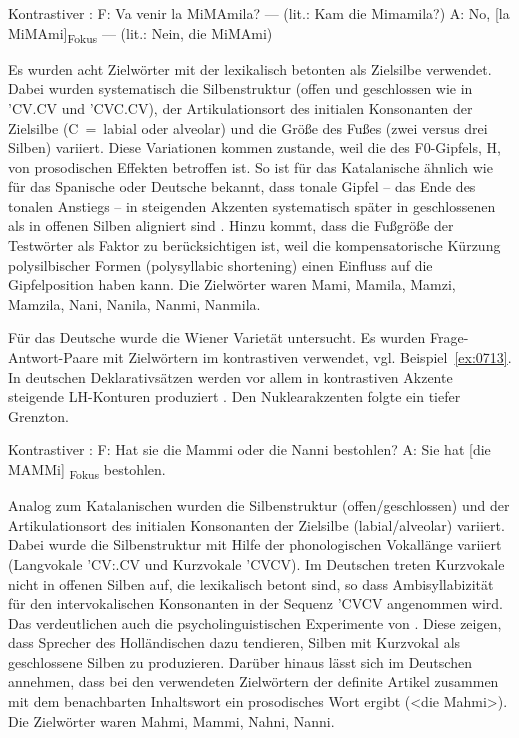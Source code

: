 \begin{exe}
	\ex Kontrastiver :\label{ex:0712}
	\sn F: Va venir la MiMAmila? --- (lit.: Kam die Mimamila?)
	\sn A: No, [la MiMAmi]\textsubscript{Fokus} --- (lit.: Nein, die MiMAmi)
\end{exe}

Es wurden acht Zielwörter mit der lexikalisch betonten  als Zielsilbe verwendet. Dabei wurden systematisch die Silbenstruktur (offen und geschlossen wie in 'CV.CV und 'CVC.CV), der Artikulationsort des initialen Konsonanten der Zielsilbe (C~=~labial oder alveolar) und die Größe des Fußes (zwei versus drei Silben) variiert. Diese Variationen kommen zustande, weil die  des F0-Gipfels, H, von prosodischen Effekten betroffen ist. So ist für das Katalanische ähnlich wie für das Spanische oder Deutsche bekannt, dass tonale Gipfel -- das Ende des tonalen Anstiegs -- in  steigenden Akzenten systematisch später in geschlossenen als in offenen Silben aligniert sind \citep[u.a.][]{Prieto2007b,Prieto2007a,Mücke2009b,Mücke2012}. Hinzu kommt, dass die Fußgröße der Testwörter als Faktor zu berücksichtigen ist, weil die kompensatorische Kürzung polysilbischer Formen (polysyllabic shortening) einen Einfluss auf die Gipfelposition haben kann. Die Zielwörter waren Mami, Mamila, Mamzi, Mamzila, Nani, Nanila, Nanmi, Nanmila.

Für das Deutsche wurde die Wiener Varietät untersucht. Es wurden Frage-Antwort-Paare mit Zielwörtern im kontrastiven  verwendet, vgl. Beispiel~\ref{ex:0713}. In deutschen Deklarativsätzen werden vor allem in  kontrastiven Akzente steigende LH-Konturen produziert \citep{Baumann2006}. Den Nuklearakzenten folgte ein tiefer Grenzton.

\begin{exe}
	\ex Kontrastiver :\label{ex:0713}
	\sn F: Hat sie die Mammi oder die Nanni bestohlen?
	\sn A: Sie hat [die MAMMi]\textsubscript{ Fokus} bestohlen.
\end{exe}

Analog zum Katalanischen wurden die Silbenstruktur (offen/geschlossen) und der Artikulationsort des initialen Konsonanten der Zielsilbe (labial/alveolar) variiert. Dabei wurde die Silbenstruktur mit Hilfe der phonologischen Vokallänge variiert (Langvokale 'CV:.CV und Kurzvokale 'CVCV). Im Deutschen treten Kurzvokale nicht in offenen Silben auf, die lexikalisch betont sind, so dass Ambisyllabizität für den intervokalischen Konsonanten in der Sequenz 'CVCV angenommen wird. Das verdeutlichen auch die psycholinguistischen Experimente von \citet{Schiller1997}. Diese zeigen, dass Sprecher des Holländischen dazu tendieren, Silben mit Kurzvokal als geschlossene Silben zu produzieren. Darüber hinaus lässt sich im Deutschen annehmen, dass bei den verwendeten Zielwörtern der definite Artikel zusammen mit dem benachbarten Inhaltswort ein prosodisches Wort ergibt (<die Mahmi>). Die Zielwörter waren Mahmi, Mammi, Nahni, Nanni.

